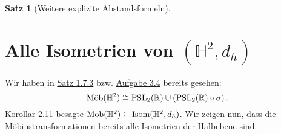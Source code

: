 \documentclass[11pt]{book}
\numberwithin{dummy}{section}
\newtheorem{theorem}{Satz}[section]
\theoremstyle{nonumberbreak}
\newenvironment{pr}[1][]{\ifthenelse{\equal{#1}{}}{\proof}{\proof[#1]}\rm}{\endproof}
\newcommand{\R}{\mathbb{R}}
\newcommand{\He}{\mathbb{H}}
\newcommand{\amob}{\textup{Möb}}
\begin{document}
\begin{spacing}{1.4}
\begin{theorem}[Weitere explizite Abstandsformeln]
\begin{pr}
\end{pr}

\end{theorem}






\section{Alle Isometrien von $(\He^2, d_h)$} %




Wir haben in \hyperlink{satzeinssiebendrei}{Satz 1.7.3} bzw. \hyperlink{Adreivier}{Aufgabe 3.4} bereits gesehen:
$$\amob(\He^2) \cong \mathrm{PSL}_2(\R) \cup \left( \mathrm{PSL}_2(\R) \circ \sigma\right).$$
Korollar 2.11 besagte $\amob(\He^2) \subseteq \mathrm{Isom}(\He^2, d_h)$. Wir zeigen nun, dass die Möbiustransformationen bereits alle Isometrien der Halbebene sind.



\end{spacing}
\end{document}
